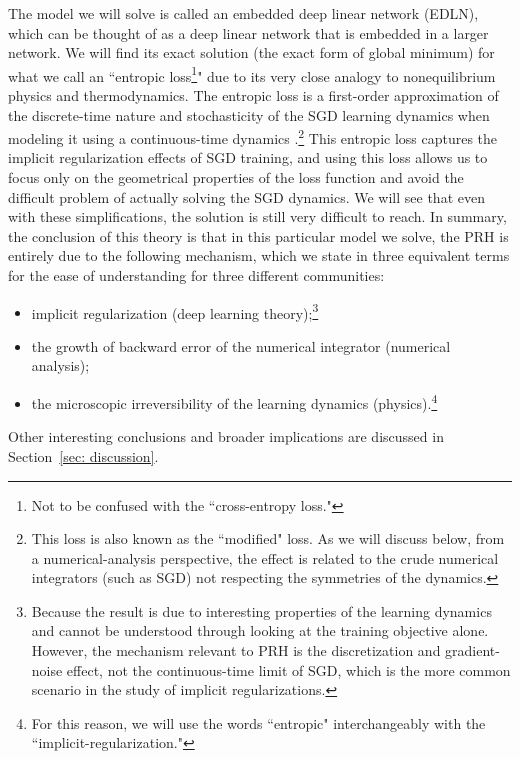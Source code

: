 \documentclass[11pt]{article}
\theoremstyle{plain}
\begin{document}
The model we will solve is called an embedded deep linear network (EDLN), which can be thought of as a deep linear network that is embedded in a larger network. We will find its exact solution (the exact form of global minimum) for what we call an ``entropic loss\footnote{Not to be confused with the ``cross-entropy loss."}" due to its very close analogy to nonequilibrium physics and thermodynamics. The entropic loss is a first-order approximation of the discrete-time nature and stochasticity of the SGD learning dynamics when modeling it using a continuous-time dynamics \cite{barrett2020implicit, smith2021origin}.\footnote{This loss is also known as the ``modified" loss. As we will discuss below, from a numerical-analysis perspective, the effect is related to the crude numerical integrators (such as SGD) not respecting the symmetries of the dynamics.} This entropic loss captures the implicit regularization effects of SGD training, and using this loss allows us to focus only on the geometrical properties of the loss function and avoid the difficult problem of actually solving the SGD dynamics. We will see that even with these simplifications, the solution is still very difficult to reach. In summary, the conclusion of this theory is that in this particular model we solve, the PRH is entirely due to the following mechanism, which we state in three equivalent terms for the ease of understanding for three different communities: 
\begin{itemize}[noitemsep,topsep=0pt, parsep=0pt,partopsep=0pt, leftmargin=25pt]
    \item implicit regularization (deep learning theory);\footnote{Because the result is due to interesting properties of the learning dynamics and cannot be understood through looking at the training objective alone. However, the mechanism relevant to PRH is the discretization and gradient-noise effect, not the continuous-time limit of SGD, which is the more common scenario in the study of implicit regularizations.}
    \item the growth of backward error of the numerical integrator (numerical analysis);
    \item the microscopic irreversibility of the learning dynamics (physics).\footnote{For this reason, we will use the words ``entropic" interchangeably with the ``implicit-regularization."}
\end{itemize}
Other interesting conclusions and broader implications are discussed in Section~\ref{sec: discussion}.
\end{document}
